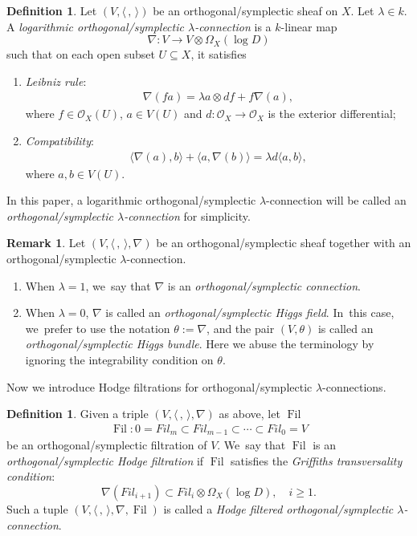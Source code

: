 \documentclass[JEP,XML,SOM,Unicode,published]{cedram}
\newcommand{\Fil}{\textit{Fil}}
\newcommand{\lconnection}{$\lambda$\nobreakdash-con\-nec\-tion\xspace}
\newcommand{\lconnections}{$\lambda$\nobreakdash-con\-nec\-tions\xspace}
\DeclareMathOperator{\Filt}{Fil}
\theoremstyle{plain}
\theoremstyle{definition}
\newtheorem{defn}[thm]{Definition}
\newtheorem{rem}[thm]{Remark}
\begin{document}
\begin{defn}\label{defn_lambda_conn}
Let $(V,\langle \,, \, \rangle)$ be an orthogonal/symplectic sheaf on $X$. Let $\lambda\in k$. A \emph{logarithmic orthogonal/symplectic \lconnection} is a $k$-linear map
\[
\nabla: V \to V\otimes \Omega_X(\log D)
\]
such that on each open subset $U \subseteq X$, it satisfies
\begin{enumerate}
\item \emph{Leibniz rule}:\vspace*{-3pt}
\begin{align*}
\nabla (fa)=\lambda a\otimes df+f\nabla(a),
\end{align*}
where $f\in \mathcal{O}_X(U)$, $a \in V(U)$ and $d: \mathcal{O}_X \to \mathcal{O}_X$ is the exterior differential;

\item \emph{Compatibility}:\vspace*{-3pt}
\begin{align*}
\langle \nabla(a),b \rangle+\langle a,\nabla(b) \rangle=\lambda d\langle a,b \rangle,
\end{align*}
where $a,b \in V(U)$.
\end{enumerate}
In this paper, a logarithmic orthogonal/symplectic \lconnection will be called an \emph{orthogonal/symplectic \lconnection} for simplicity.
\end{defn}

\begin{rem}
Let $(V,\langle \,, \, \rangle,\nabla)$ be an orthogonal/symplectic sheaf together with an orthogonal/symplectic \lconnection. 
\begin{enumerate}
\item When $\lambda=1$, we~say that $\nabla$ is an \emph{orthogonal/symplectic connection}.

\item When $\lambda=0$, $\nabla$ is called an \emph{orthogonal/symplectic Higgs field}. In~this case, we~prefer to use the notation $\theta := \nabla$, and the pair $(V,\theta)$ is called an \emph{orthogonal/symplectic Higgs bundle}. Here we abuse the terminology by ignoring the integrability condition on $\theta$.
\end{enumerate}
\end{rem}

Now we introduce Hodge filtrations for orthogonal/symplectic \lconnections.
\begin{defn}\label{defn_na_Hod_fil}
Given a triple $(V,\langle \,, \, \rangle,\nabla)$ as above, let $\Filt$\vspace*{-3pt}
\begin{align*}
\Filt: 0=\Fil_m \subset \Fil_{m-1} \subset \cdots \subset \Fil_0=V
\end{align*}
be an orthogonal/symplectic filtration of $V$. We~say that $\Filt $ is an \emph{orthogonal/sym\-plec\-tic Hodge filtration} if $\Filt $ satisfies the \emph{Griffiths transversality condition}:\vspace*{-3pt}
\[
\nabla(\Fil_{i+1})\subset \Fil_{i}\otimes \Omega_X(\log D), \quad i \geq 1.
\]
Such a tuple $(V, \langle \,, \, \rangle, \nabla, \Filt)$ is called a \emph{Hodge filtered orthogonal/symplectic \lconnection}.
\end{defn}
\end{document}

